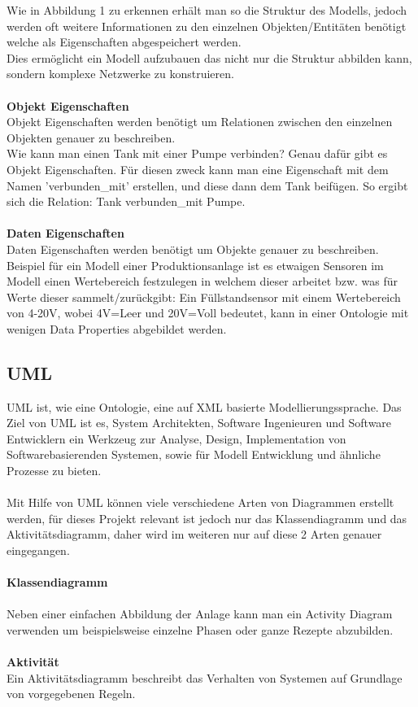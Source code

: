 Wie in Abbildung 1 zu erkennen erhält man so die Struktur des Modells, jedoch werden oft weitere Informationen zu den einzelnen Objekten/Entitäten benötigt welche als Eigenschaften abgespeichert werden.\\
Dies ermöglicht ein Modell aufzubauen das nicht nur die Struktur abbilden kann, sondern komplexe Netzwerke zu konstruieren.\\
\\
\noindent \textbf{Objekt Eigenschaften}\\
Objekt Eigenschaften werden benötigt um Relationen zwischen den einzelnen Objekten genauer zu beschreiben.\\ 
Wie kann man einen Tank mit einer Pumpe verbinden? Genau dafür gibt es Objekt Eigenschaften. Für diesen zweck kann man eine Eigenschaft mit dem Namen 'verbunden\_mit' erstellen, und diese dann dem Tank beifügen. So ergibt sich die Relation: Tank verbunden\_mit Pumpe.\\
\\
\textbf{Daten Eigenschaften}\\
Daten Eigenschaften werden benötigt um Objekte genauer zu beschreiben. 
\\
Beispiel für ein Modell einer Produktionsanlage ist es etwaigen Sensoren im Modell einen Wertebereich festzulegen in welchem dieser arbeitet bzw. was für Werte dieser sammelt/zurückgibt: Ein Füllstandsensor mit einem Wertebereich von 4-20V, wobei 4V=Leer und 20V=Voll bedeutet, kann in einer Ontologie mit wenigen Data Properties abgebildet werden.

\subsection{UML}
UML ist, wie eine Ontologie, eine auf XML basierte Modellierungssprache.
Das Ziel von UML ist es, System Architekten, Software Ingenieuren und Software Entwicklern ein Werkzeug zur Analyse, Design, Implementation von Softwarebasierenden Systemen, sowie für Modell Entwicklung und ähnliche Prozesse zu bieten.\\
\\
Mit Hilfe von UML können viele verschiedene Arten von Diagrammen erstellt werden, für dieses Projekt relevant ist jedoch nur das Klassendiagramm und das Aktivitätsdiagramm, daher wird im weiteren nur auf diese 2 Arten genauer eingegangen.\\
\\
\textbf{Klassendiagramm}\\
\\
Neben einer einfachen Abbildung der Anlage kann man ein Activity Diagram verwenden um beispielsweise einzelne Phasen oder ganze Rezepte abzubilden.\\
\\
\textbf{Aktivität}\\
Ein Aktivitätsdiagramm beschreibt das Verhalten von Systemen auf Grundlage von vorgegebenen Regeln. 

